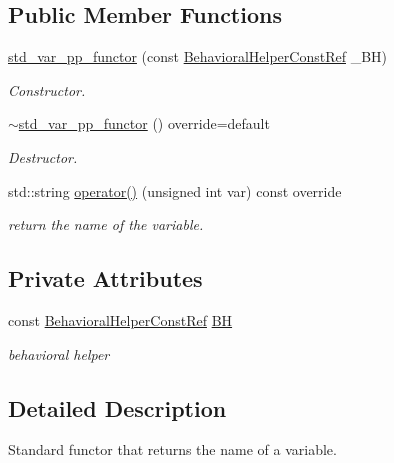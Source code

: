 \subsection*{Public Member Functions}
\begin{DoxyCompactItemize}
\item 
\hyperlink{structstd__var__pp__functor_a5e79f2419dd19f1ce0fb5e425093d4bf}{std\+\_\+var\+\_\+pp\+\_\+functor} (const \hyperlink{behavioral__helper_8hpp_aae973b54cac87eef3b27442aa3e1e425}{Behavioral\+Helper\+Const\+Ref} \+\_\+\+BH)
\begin{DoxyCompactList}\small\item\em Constructor. \end{DoxyCompactList}\item 
\hyperlink{structstd__var__pp__functor_a0755528d3c7000f6c7558d89a0c596b7}{$\sim$std\+\_\+var\+\_\+pp\+\_\+functor} () override=default
\begin{DoxyCompactList}\small\item\em Destructor. \end{DoxyCompactList}\item 
std\+::string \hyperlink{structstd__var__pp__functor_a0fe9aed55084be9ea80846ad5ceee014}{operator()} (unsigned int var) const override
\begin{DoxyCompactList}\small\item\em return the name of the variable. \end{DoxyCompactList}\end{DoxyCompactItemize}
\subsection*{Private Attributes}
\begin{DoxyCompactItemize}
\item 
const \hyperlink{behavioral__helper_8hpp_aae973b54cac87eef3b27442aa3e1e425}{Behavioral\+Helper\+Const\+Ref} \hyperlink{structstd__var__pp__functor_a87e28abced1e150ba628419c23e14860}{BH}
\begin{DoxyCompactList}\small\item\em behavioral helper \end{DoxyCompactList}\end{DoxyCompactItemize}


\subsection{Detailed Description}
Standard functor that returns the name of a variable. 

